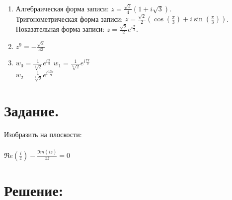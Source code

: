 \documentclass[12pt, a4paper]{article}
\begin{document}
\begin{enumerate}
    \item [а)]
        Алгебраическая форма записи:
        $z = \frac{\sqrt{2}}{4}(1 + i\sqrt{3})$.\\
        Тригонометрическая форма записи:
        $z = \frac{\sqrt{2}}{2}(\cos(\frac{\pi}{3}) + i\sin(\frac{\pi}{3}))$.\newline
        Показательная форма записи:
        $z = \frac{\sqrt{2}}{2}e^{i\frac{\pi}{3}}$.\\
    \item [б)] $z^9 = -\frac{\sqrt{2}}{32}$
    \item [в)] $w_0 = \frac{1}{\sqrt[6]{2}}e^{i\frac{\pi}{9}}$\newline
        $w_1 = \frac{1}{\sqrt[6]{2}}e^{i\frac{7\pi}{9}}$\\
        $w_2 = \frac{1}{\sqrt[6]{2}}e^{i\frac{13\pi}{9}}$\\
\end{enumerate}
\newpage

%
%
\section{Задание.}

Изобразить на плоскости:\\\\
$\Re e(\frac{i}{z}) - \frac{\Im m(iz)}{z\overline{z}} = 0$

\section*{Решение:}
\end{document}
